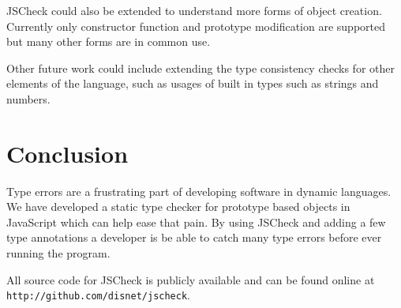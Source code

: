 \documentclass{article}
\begin{document}
JSCheck could also be extended to understand more forms of object creation. Currently
only constructor function and prototype modification are supported but many other forms
are in common use.

Other future work could include extending the type consistency checks for other elements 
of the language, such as usages of built in types such as strings and numbers.

\section{Conclusion}
\label{sec:conclusion}
Type errors are a frustrating part of developing software in dynamic languages.
We have developed a static type checker for prototype based objects in JavaScript which
can help ease that pain.
By using JSCheck and adding a few type annotations a developer is be able to catch many
type errors before ever running the program. 

All source code for JSCheck is publicly available and can be found online at
{\tt http://github.com/disnet/jscheck}.



\end{document}
